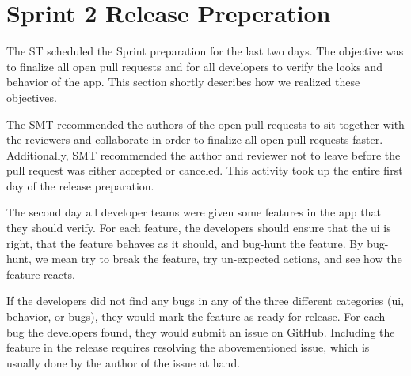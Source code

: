 \section{Sprint 2 Release Preperation}
The \gls{ST} scheduled the Sprint preparation for the last two days. The objective was to finalize all open pull requests and for all developers to verify the looks and behavior of the app. This section shortly describes how we realized these objectives.

The \gls{SMT} recommended the authors of the open pull-requests to sit together with the reviewers and collaborate in order to finalize all open pull requests faster. Additionally, \gls{SMT} recommended the author and reviewer not to leave before the pull request was either accepted or canceled. This activity took up the entire first day of the release preparation.

The second day all developer teams were given some features in the app that they should verify. For each feature, the developers should ensure that the \gls{ui} is right, that the feature behaves as it should, and bug-hunt the feature. By bug-hunt, we mean try to break the feature, try un-expected actions, and see how the feature reacts.

If the developers did not find any bugs in any of the three different categories (\gls{ui}, behavior, or bugs), they would mark the feature as ready for release. For each bug the developers found, they would submit an issue on GitHub. Including the feature in the release requires resolving the abovementioned issue, which is usually done by the author of the issue at hand.